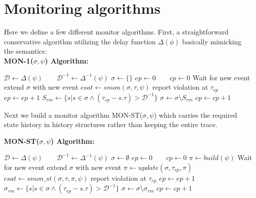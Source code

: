 \documentclass[10pt,a4paper]{article}
\newcommand{\ep}{ep}
\newcommand{\cp}{cp}
\begin{document}
\section{Monitoring algorithms}
Here we define a few different monitor algorithms. First, a straightforward conservative algorithm utilizing the delay function $\Delta(\phi)$ basically mimicking the semantics:
\\
\textbf{MON-1($\sigma, \psi$) Algorithm:}
\begin{algorithmic}[1]
\STATE $\mathcal{D} \leftarrow \Delta(\psi) \quad \quad \mathcal{D}^{-1} \leftarrow \Delta^{-1}(\psi)$
\STATE $\sigma \leftarrow \{\}$
\STATE $\ep \leftarrow 0 \quad \quad \cp \leftarrow 0$
\LOOP
\STATE Wait for new event
\STATE extend $\sigma$ with new event
\WHILE{$\tau_{\cp} - \tau_{\ep} \geq \mathcal{D}$}
\STATE $csat \leftarrow smon(\sigma, \tau, \psi)$
\STATE report violation at $\tau_{\ep}$
\ENDIF
\STATE $\ep \leftarrow \ep + 1$
\ENDWHILE
\STATE $S_{rm} \leftarrow \{ s | s \in \sigma \wedge (\tau_{\ep} - s.\tau) > \mathcal{D}^{-1} \}$
\STATE $\sigma \leftarrow \sigma \setminus S_{rm}$
\STATE $\cp \leftarrow \cp + 1$
\ENDLOOP
\end{algorithmic}

Next we build a monitor algorithm MON-ST($\sigma, \psi$) which carries the required state history in history structures rather than keeping the entire trace.

\textbf{MON-ST($\sigma, \psi$) Algorithm:}
\begin{algorithmic}[1]
\STATE $\mathcal{D} \leftarrow \Delta(\psi) \quad \quad \mathcal{D}^{-1} \leftarrow \Delta^{-1}(\psi)$
\STATE $\sigma \leftarrow \emptyset$
\STATE $\ep \leftarrow 0 \quad \quad \cp \leftarrow 0$
\STATE $\pi \leftarrow build(\psi)$
\LOOP
\STATE Wait for new event
\STATE extend $\sigma$ with new event
\STATE $\pi \leftarrow update(\sigma, \tau_{cp}, \pi)$
\WHILE{$\tau_{\cp} - \tau_{\ep} \geq \mathcal{D}$}
\STATE $csat \leftarrow smon\_st(\sigma, \tau, \pi, \psi)$
\STATE report violation at $\tau_{\ep}$
\ENDIF
\STATE $\ep \leftarrow \ep + 1$
\ENDWHILE
\STATE $\sigma_{rm} \leftarrow \{ s | s \in \sigma \wedge (\tau_{\ep} - s.\tau) > \mathcal{D}^{-1} \}$
\STATE $\sigma \leftarrow \sigma \setminus \sigma_{rm}$
\STATE $\cp \leftarrow \cp + 1$
\ENDLOOP
\end{algorithmic}
\end{document}
